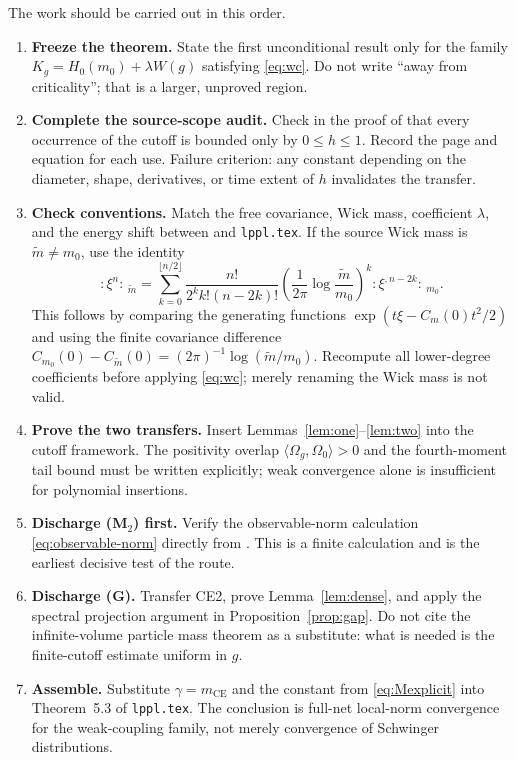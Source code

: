 \documentclass[11pt,a4paper]{article}
\theoremstyle{remark}
\newcommand{\Om}{\Omega}
\newcommand{\CE}{\mathrm{CE}}
\begin{document}
The work should be carried out in this order.

\begin{enumerate}
\item \textbf{Freeze the theorem.}  State the first unconditional result only for the family
$K_g=H_0(m_0)+\lambda W(g)$ satisfying \eqref{eq:wc}.  Do not write ``away from criticality'';
that is a larger, unproved region.

\item \textbf{Complete the source-scope audit.}  Check in the proof of
\cite[Thms.~1.1.8 and 1.1.11]{GJS} that every occurrence of the cutoff is bounded only by
$0\le h\le1$.  Record the page and equation for each use.  Failure criterion: any constant
depending on the diameter, shape, derivatives, or time extent of $h$ invalidates the transfer.

\item \textbf{Check conventions.}  Match the free covariance, Wick mass, coefficient $\lambda$,
and the energy shift between \cite{GJS} and \texttt{lppl.tex}.  If the source Wick mass is
$\widetilde m\ne m_0$, use the identity
\[
 :\!\xi^n\!:\,_{\widetilde m}
 =\sum_{k=0}^{\lfloor n/2\rfloor}
   \frac{n!}{2^k k!(n-2k)!}
   \left(\frac{1}{2\pi}\log\frac{\widetilde m}{m_0}\right)^k
   :\!\xi^{,n-2k}\!:\,_{m_0}.                                    \tag{6.1}
\]
This follows by comparing the generating functions
$\exp(t\xi-C_m(0)t^2/2)$ and using the finite covariance difference
$C_{m_0}(0)-C_{\widetilde m}(0)=(2\pi)^{-1}\log(\widetilde m/m_0)$.  Recompute all
lower-degree coefficients before applying \eqref{eq:wc}; merely renaming the Wick mass is not
valid.

\item \textbf{Prove the two transfers.}  Insert Lemmas~\ref{lem:one}--\ref{lem:two} into the
cutoff framework.  The positivity overlap $\langle\Om_g,\Om_0\rangle>0$ and the fourth-moment
tail bound must be written explicitly; weak convergence alone is insufficient for polynomial
insertions.

\item \textbf{Discharge (M$_2$) first.}  Verify the observable-norm calculation
\eqref{eq:observable-norm} directly from \cite[(1.1.7)--(1.1.9)]{GJS}.  This is a finite calculation and is
the earliest decisive test of the route.

\item \textbf{Discharge (G).}  Transfer CE2, prove Lemma~\ref{lem:dense}, and apply the spectral
projection argument in Proposition~\ref{prop:gap}.  Do not cite the infinite-volume particle
mass theorem as a substitute: what is needed is the finite-cutoff estimate uniform in $g$.

\item \textbf{Assemble.}  Substitute $\gamma=m_{\CE}$ and the constant from
\eqref{eq:Mexplicit} into Theorem~5.3 of \texttt{lppl.tex}.  The conclusion is full-net local-norm
convergence for the weak-coupling family, not merely convergence of Schwinger distributions.
\end{enumerate}
\end{document}
